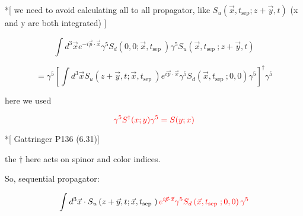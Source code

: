 \documentclass[prd,aps,nofootinbib,floatfix,10pt]{revtex4}
\begin{document}
*[ we need to avoid calculating all to all propagator, like $S_u(\vec{x},t_{\text{sep}};z+\vec{y},t)$ (x and y are both integrated) ]

\[ \int d^{3} \vec{x} e^{-i \vec{p} \cdot \vec{x}} \gamma^{5} S_{d}\left(0,0 ; \vec{x}, t_{\text {sep }}\right) \gamma^{5} S_{u}\left(\vec{x}, t_{\text {sep }} ; z+\vec{y}, t\right) \]

\[ = \gamma^5 [\int d^{3} \vec{x} S_{u}\left(z+\vec{y}, t; \vec{x}, t_{\text {sep }} \right) e^{i \vec{p} \cdot \vec{x}} \gamma^{5} S_{d}\left(\vec{x}, t_{\text {sep }}; 0,0 \right) \gamma^{5} ]^{\dagger} \gamma^5 \]

here we used 

\[ {\color{red} \gamma^5 S^{\dagger}(x;y) \gamma^5 = S(y;x) } \]

*[ Gattringer P136 (6.31)]

the $\dagger$ here acts on spinor and color indices.

So, sequential propagator:

\[ \int d^{3} \vec{x} \cdot S_{u}\left(z+\vec{y}, t; \vec{x}, t_{\text {sep }} \right) {\color{red} e^{i \vec{p} \cdot \vec{x}} \gamma^{5} S_{d}\left(\vec{x}, t_{\text {sep }}; 0,0 \right) \gamma^{5} } \]
\end{document}
